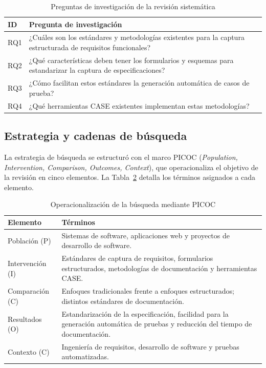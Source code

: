 \documentclass[10pt,journal,twoside,letterpaper]{IEEEtran}
\begin{document}
	\begin{table}[!tb]
		\caption{Preguntas de investigación de la revisión sistemática}
		\label{tab:rqs}
		\centering
		\small
		\begin{tabular}{@{}p{}p{}@{}}
			\toprule
			\textbf{ID} & \textbf{Pregunta de investigación} \\
			\midrule
			RQ1 & ¿Cuáles son los estándares y metodologías existentes para la captura estructurada de requisitos funcionales? \\
			RQ2 & ¿Qué características deben tener los formularios y esquemas para estandarizar la captura de especificaciones? \\
			RQ3 & ¿Cómo facilitan estos estándares la generación automática de casos de prueba? \\
			RQ4 & ¿Qué herramientas CASE existentes implementan estas metodologías? \\
			\bottomrule
		\end{tabular}
	\end{table}

	\subsection{Estrategia y cadenas de búsqueda}
	\label{subsec:busqueda}

	La estrategia de búsqueda se estructuró con el marco PICOC (\emph{Population, Intervention, Comparison, Outcomes, Context}), que operacionaliza el objetivo de la revisión en cinco elementos. La Tabla~\ref{tab:picoc} detalla los términos asignados a cada elemento.

	\begin{table}[!tb]
		\caption{Operacionalización de la búsqueda mediante PICOC}
		\label{tab:picoc}
		\centering
		\small
		\begin{tabular}{@{}p{}p{}@{}}
			\toprule
			\textbf{Elemento} & \textbf{Términos} \\
			\midrule
			Población (P)   & Sistemas de software, aplicaciones web y proyectos de desarrollo de software. \\
			Intervención (I)& Estándares de captura de requisitos, formularios estructurados, metodologías de documentación y herramientas CASE. \\
			Comparación (C) & Enfoques tradicionales frente a enfoques estructurados; distintos estándares de documentación. \\
			Resultados (O)  & Estandarización de la especificación, facilidad para la generación automática de pruebas y reducción del tiempo de documentación. \\
			Contexto (C)    & Ingeniería de requisitos, desarrollo de software y pruebas automatizadas. \\
			\bottomrule
		\end{tabular}
	\end{table}
\end{document}
